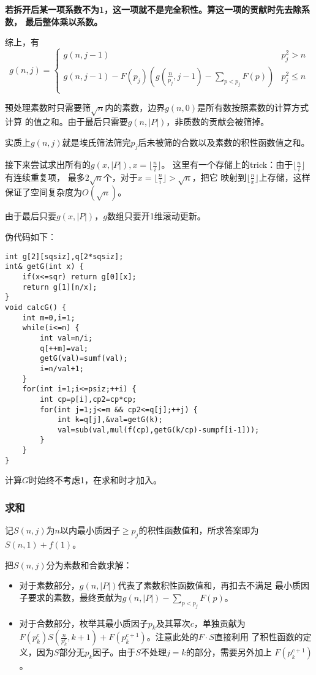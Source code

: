 {\bfseries 若拆开后某一项系数不为1，这一项就不是完全积性。算这一项的贡献时先去除系数，
最后整体乘以系数。}

综上，有\begin{displaymath}
    g(n,j)=\left\{\begin{array}{lr}
        g(n,j-1)        & p_j^2>n   \\
        g(n,j-1)-F(p_j)(g(\frac{n}{p_j},j-1)-\displaystyle \sum_{p<p_j}{F(p)}) & p_j^2\leq n \\
    \end{array}\right.
\end{displaymath}

预处理素数时只需要筛$\sqrt{n}$内的素数，边界$g(n,0)$是所有数按照素数的计算方式计算
的值之和。由于最后只需要$g(n,|P|)$，非质数的贡献会被筛掉。

实质上$g(n,j)$就是埃氏筛法筛完$p_j$后未被筛的合数以及素数的积性函数值之和。

接下来尝试求出所有的$g(x,|P|),x=\lfloor \frac{n}{i}\rfloor$。
这里有一个存储上的trick：由于$\lfloor \frac{n}{i}\rfloor$有连续重复项，
最多$2\sqrt{n}$个，对于$x=\lfloor \frac{n}{i}\rfloor>\sqrt{n}$，把它
映射到$\lfloor \frac{n}{x}\rfloor$上存储，这样保证了空间复杂度为$O(\sqrt{n})$。

由于最后只要$g(x,|P|)$，$g$数组只要开1维滚动更新。

伪代码如下：
\begin{lstlisting}
int g[2][sqsiz],q[2*sqsiz];
int& getG(int x) {
    if(x<=sqr) return g[0][x];
    return g[1][n/x];
}
void calcG() {
    int m=0,i=1;
    while(i<=n) {
        int val=n/i;
        q[++m]=val;
        getG(val)=sumf(val);
        i=n/val+1;
    }
    for(int i=1;i<=psiz;++i) {
        int cp=p[i],cp2=cp*cp;
        for(int j=1;j<=m && cp2<=q[j];++j) {
            int k=q[j],&val=getG(k);
            val=sub(val,mul(f(cp),getG(k/cp)-sumpf[i-1]));
        }
    }
}
\end{lstlisting}

计算$G$时始终不考虑1，在求和时才加入。
\subsubsection{求和}
记$S(n,j)$为$n$以内最小质因子$\geq p_j$的积性函数值和，所求答案即为$S(n,1)+f(1)$。

把$S(n,j)$分为素数和合数求解：
\begin{itemize}
    \item 对于素数部分，$g(n,|P|)$代表了素数积性函数值和，再扣去不满足
    最小质因子要求的素数，最终贡献为$g(n,|P|)-\displaystyle \sum_{p<p_j}F(p)$。
    \item 对于合数部分，枚举其最小质因子$p_k$及其幂次$c$，单独贡献为\\
    $F(p_k^c)S(\frac{n}{p_k^c},k+1)+F(p_k^{c+1})$。注意此处的$F\cdot S$直接利用
    了积性函数的定义，因为$S$部分无$p_k$因子。由于$S$不处理$j=k$的部分，需要另外加上
    $F(p_k^{c+1})$。
\end{itemize}

